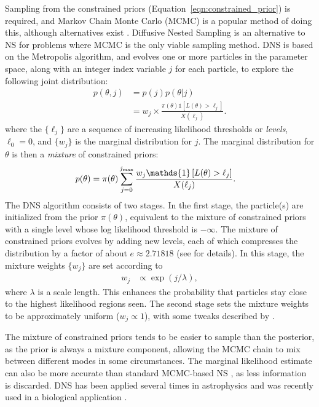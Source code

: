 \documentclass[article, nojss]{jss}
\begin{document}
Sampling from the constrained priors (Equation~\ref{eqn:constrained_prior})
is required, and Markov Chain Monte Carlo (MCMC) is a popular method of doing
this, although alternatives exist
\citep[e.g.][]{feroz2009multinest, handley2015polychord}.
Diffusive Nested Sampling \citep[DNS;][]{brewer2011diffusive}
is an alternative to NS for
problems where MCMC is the only viable sampling method. DNS is based on the
Metropolis algorithm, and evolves one or more particles in the parameter space, along with
an integer index variable $j$ for each particle,
to explore the following joint distribution:
\begin{align}
p(\theta, j) &= p(j)p(\theta | j)\\
&= w_j \times
\frac{\pi(\theta)\mathds{1}\left[L(\theta) > \ell_j\right]}{X(\ell_j)}.
\label{eqn:target_distribution}
\end{align}
where the $\{\ell_j\}$ are a sequence of increasing likelihood thresholds
or {\em levels},
$\ell_0 = 0$, and $\{w_j\}$ is the marginal distribution for $j$.
The marginal distribution for $\theta$ is then a {\em mixture} of
constrained priors:
\begin{align}
p(\theta) &=
\pi(\theta)\sum_{j=0}^{j_{\rm max}}
\frac{w_j\mathds{1}\left[L(\theta) > \ell_j\right]}{X(\ell_j)}.
\label{eqn:mixture_of_constrained_priors}
\end{align}
The DNS algorithm consists of two stages. In the first stage,
the particle(s) are initialized from the prior $\pi(\theta)$, equivalent
to the mixture of constrained priors with a single level whose log likelihood
threshold is $-\infty$. The mixture of constrained priors evolves by adding new levels,
each of which compresses the distribution by a factor of about $e \approx 2.71818$
(see \citet{brewer2011diffusive} for details). In this stage,
the mixture weights $\{w_j\}$ are set according to
\begin{align}
w_j &\propto \exp(j/\lambda),\label{eqn:weighting}
\end{align}
where $\lambda$ is a scale length.
This enhances the probability that particles stay close to the
highest likelihood regions seen.
The second stage sets the mixture weights to be approximately
uniform ($w_j \propto 1$), with some tweaks described by
\citet{brewer2011diffusive}.

The mixture of constrained priors tends to be easier to sample than the
posterior, as the prior is always a mixture component, allowing the
MCMC chain to mix between different modes in some circumstances. The marginal
likelihood estimate can also be more accurate than standard MCMC-based NS
\citep{brewer2011diffusive}, as less information is discarded.
DNS has been applied several times in astrophysics
\citep[e.g.][]{pancoast2014modelling, huppenkothen2015dissecting,
brewer2015fast}
and was recently used in a biological application
\citep{dybowski2015single}.
\end{document}
